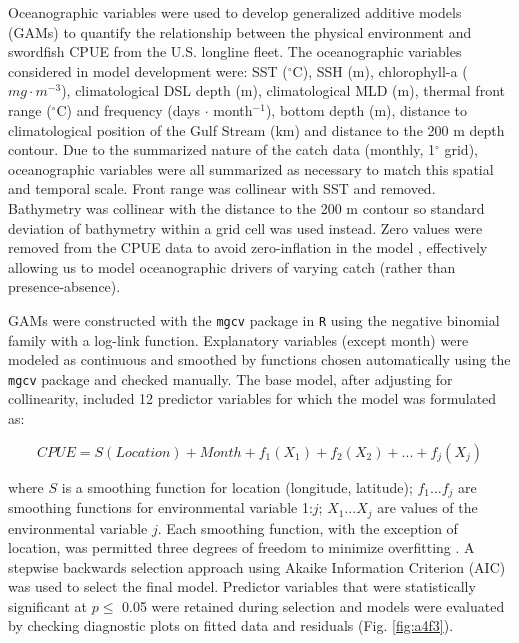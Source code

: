 Oceanographic variables were used to develop generalized additive models (GAMs) to quantify the relationship between the physical environment and swordfish CPUE from the U.S. longline fleet. The oceanographic variables considered in model development were: SST ($^{\circ}$C), SSH (m), chlorophyll-a (\(mg \cdot m^{-3}\)), climatological DSL depth (m), climatological MLD (m), thermal front range ($^{\circ}$C) and frequency (days \(\cdot\) month\(^{-1}\)), bottom depth (m), distance to climatological position of the Gulf Stream (km) and distance to the 200 m depth contour. Due to the summarized nature of the catch data (monthly, 1$^{\circ}$ grid), oceanographic variables were all summarized as necessary to match this spatial and temporal scale. Front range was collinear with SST and removed. Bathymetry was collinear with the distance to the 200 m contour so standard deviation of bathymetry within a grid cell was used instead. Zero values were removed from the CPUE data to avoid zero-inflation in the model \citep{Zuur2009, Maunder2004}, effectively allowing us to model oceanographic drivers of varying catch (rather than presence-absence).

GAMs were constructed with the \texttt{mgcv} package \citep{Wood2006} in \texttt{R} using the negative binomial family with a log-link function. Explanatory variables (except month) were modeled as continuous and smoothed by functions chosen automatically using the \texttt{mgcv} package and checked manually. The base model, after adjusting for collinearity, included 12 predictor variables for which the model was formulated as:

\begin{equation}
CPUE = S(Location) + Month + f_1(X_1) + f_2(X_2) + ... + f_j(X_j)
\label{eq:gam}
\end{equation}

where \(S\) is a smoothing function for location (longitude, latitude); \(f_1...f_j\) are smoothing functions for environmental variable 1:\(j\); \(X_1...X_j\) are values of the environmental variable \(j\). Each smoothing function, with the exception of location, was permitted three degrees of freedom to minimize overfitting \citep{Rooker2012}. A stepwise backwards selection approach using Akaike Information Criterion (AIC) was used to select the final model. Predictor variables that were statistically significant at \(p \leq\) 0.05 were retained during selection and models were evaluated by checking diagnostic plots on fitted data and residuals (Fig. \ref{fig:a4f3}).

